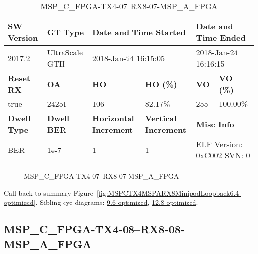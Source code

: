 \begin{table}[h]
\centering
\caption{MSP\_C\_FPGA-TX4-07--RX8-07-MSP\_A\_FPGA}
\label{tab:MSPCFPGATX407RX807MSPAFPGA6.4-optimized}
\begin{tabular}{@{}|l|l|l|l|l|l|@{}}
\toprule
\textbf{SW Version}                & \textbf{GT Type}   & \multicolumn{2}{l|}{\textbf{Date and Time Started}}            & \multicolumn{2}{l|}{\textbf{Date and Time Ended}}        \\ \midrule
2017.2                       & UltraScale GTH          & \multicolumn{2}{l|}{2018-Jan-24 16:15:05}                   & \multicolumn{2}{l|}{2018-Jan-24 16:16:15}               \\ \midrule
\textbf{Reset RX}                  & \textbf{OA} & \textbf{HO}   & \textbf{HO (\%)} & \textbf{VO} & \textbf{VO (\%)} \\ \midrule
true & 24251        & 106          & 82.17\%        & 255        & 100.00\%       \\ \midrule
\textbf{Dwell Type}                & \textbf{Dwell BER} & \textbf{Horizontal Increment} & \textbf{Vertical Increment}    & \multicolumn{2}{l|}{\textbf{Misc Info}}                  \\ \midrule
BER                            & 1e-7        & 1        & 1           & \multicolumn{2}{l|}{ELF Version: 0xC002 SVN: 0}                         \\ \bottomrule
\end{tabular}
\end{table}

\begin{figure}[h]
\caption{MSP\_C\_FPGA-TX4-07--RX8-07-MSP\_A\_FPGA} \label{fig:MSPCFPGATX407RX807MSPAFPGA6.4-optimized}
\end{figure}

Call back to summary Figure~\ref{fig:MSPCTX4MSPARX8MinipodLoopback6.4-optimized}.
Sibling eye diagrams: \hyperref[sec:MSPCFPGATX407RX807MSPAFPGA9.6-optimized]{9.6-optimized}, \hyperref[sec:MSPCFPGATX407RX807MSPAFPGA12.8-optimized]{12.8-optimized}.

\clearpage
\newpage


\subsection{MSP\_C\_FPGA-TX4-08--RX8-08-MSP\_A\_FPGA}\label{sec:MSPCFPGATX408RX808MSPAFPGA6.4-optimized}

